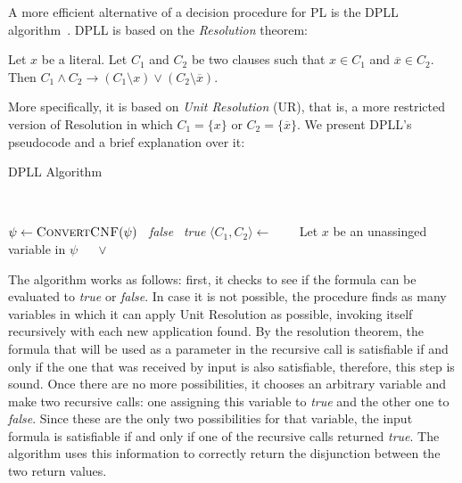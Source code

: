 A more efficient alternative of a decision procedure for PL is the DPLL algorithm~\cite{dpll}. DPLL is based on the \textit{Resolution} theorem:

\begin{theorem}[Resolution]
Let $x$ be a literal. Let $C_{1}$ and $C_{2}$ be two clauses such that $x \in C_{1}$ and $\overline x \in C_{2}$. Then $C_{1} \wedge C_{2} \rightarrow (C_{1} \setminus x) \vee (C_{2} \setminus \overline x)$.
\end{theorem}

More specifically, it is based on \textit{Unit Resolution} (UR), that is, a more restricted version of Resolution in which $C_{1} = \{x\}$ or $C_{2} = \{\overline x\}$. We present DPLL's pseudocode and a brief explanation over it:

\begin{algorithm}[H]
\caption{DPLL Algorithm}~\label{dpllAlgo}
\begin{algorithmic}[1]
\State $\psi \gets \Call{ConvertCNF}{\psi}$
  \State \Return~\textit{false}
  \State \Return~\textit{true}
\Else
    \State $\langle C_{1}, C_{2} \rangle \gets$  
    \State~\Return~
  \Else
    \State~Let $x$ be an unassinged variable in $\psi$
    \State~\Return~ $\vee$ 
  \EndIf
\EndIf
\EndFunction
\end{algorithmic}
\end{algorithm}

The algorithm works as follows: first, it checks to see if the formula can be evaluated to \textit{true} or \textit{false}. In case it is not possible, the procedure finds as many variables in which it can apply Unit Resolution as possible, invoking itself recursively with each new application found. By the resolution theorem, the formula that will be used as a parameter in the recursive call is satisfiable if and only if the one that was received by input is also satisfiable, therefore, this step is sound. Once there are no more possibilities, it chooses an arbitrary variable and make two recursive calls: one assigning this variable to \textit{true} and the other one to \textit{false}. Since these are the only two possibilities for that variable, the input formula is satisfiable if and only if one of the recursive calls returned \textit{true}. The algorithm uses this information to correctly return the disjunction between the two return values.

